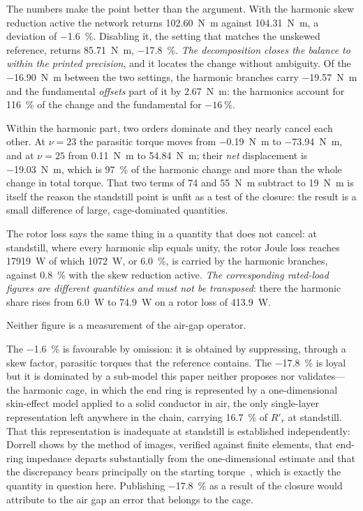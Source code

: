 \documentclass[10pt,a4paper,twocolumn]{article}
\theoremstyle{plain}
\theoremstyle{remark}
\begin{document}
The numbers make the point better than the argument. With the harmonic
skew reduction active the network returns \SI{102.60}{\newton\metre}
against \SI{104.31}{\newton\metre}, a deviation of
\SI{-1.6}{\percent}. Disabling it, the setting that matches the
unskewed reference, returns \SI{85.71}{\newton\metre},
\SI{-17.8}{\percent}. \emph{The decomposition closes the balance to
within the printed precision}, and it locates the change without
ambiguity. Of the
\SI{-16.90}{\newton\metre} between the two settings, the harmonic
branches carry \SI{-19.57}{\newton\metre} and the fundamental
\emph{offsets} part of it by \SI{+2.67}{\newton\metre}: the harmonics
account for \SI{116}{\percent} of the change and the fundamental for
$-\SI{16}{\percent}$.

Within the harmonic part, two orders dominate and they nearly cancel
each other. At $\nu=23$ the parasitic torque moves from
\SI{-0.19}{\newton\metre} to \SI{-73.94}{\newton\metre}, and at
$\nu=25$ from \SI{+0.11}{\newton\metre} to \SI{+54.84}{\newton\metre};
their \emph{net} displacement is \SI{-19.03}{\newton\metre}, which is
\SI{97}{\percent} of the harmonic change and more than the whole change
in total torque. That two terms of \num{74} and \SI{55}{\newton\metre}
subtract to \SI{19}{\newton\metre} is itself the reason the standstill
point is unfit as a test of the closure: the result is a small
difference of large, cage-dominated quantities.

The rotor loss says the same thing in a quantity that does not cancel:
at standstill, where every harmonic slip equals unity, the rotor Joule
loss reaches \SI{17919}{\watt} of which \SI{1072}{\watt}, or
\SI{6.0}{\percent}, is carried by the harmonic branches, against
\SI{0.8}{\percent} with the skew reduction active. \emph{The
corresponding rated-load figures are different quantities and must not
be transposed}: there the harmonic share rises from \SI{6.0}{\watt} to
\SI{74.9}{\watt} on a rotor loss of \SI{413.9}{\watt}.

Neither figure is a measurement of the air-gap operator.

The \SI{-1.6}{\percent} is favourable by omission: it is obtained by
suppressing, through a skew factor, parasitic torques that the reference
contains. The \SI{-17.8}{\percent} is loyal but it is dominated by a
sub-model this paper neither proposes nor validates---the harmonic cage,
in which the end ring is represented by a one-dimensional
skin-effect model applied to a solid conductor in air, the only
single-layer representation left anywhere in the chain, carrying
\SI{16.7}{\percent} of $R'_r$ at standstill. That this representation is
inadequate at standstill is established independently: Dorrell shows by
the method of images, verified against finite elements, that end-ring
impedance departs substantially from the one-dimensional estimate and
that the discrepancy bears principally on the starting
torque~\cite{dorrell2005}, which is exactly the quantity in question
here. Publishing
\SI{-17.8}{\percent} as a result of the closure would attribute to the
air gap an error that belongs to the cage.
\end{document}
